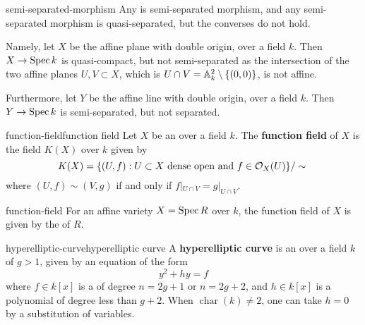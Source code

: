 \begin{example}{semi-separated-morphism}
    Any  is semi-separated morphism, and any semi-separated morphism is quasi-separated, but the converses do not hold.
    
    Namely, let $X$ be the affine plane with double origin, over a field $k$. Then $X \to \Spec k$ is quasi-compact, but not semi-separated as the intersection of the two affine planes $U, V \subset X$, which is $U \cap V = \AA^2_k \setminus \{ (0, 0) \}$, is not affine.
    
    Furthermore, let $Y$ be the affine line with double origin, over a field $k$. Then $Y \to \Spec k$ is semi-separated, but not separated.
\end{example}

\begin{topic}{function-field}{function field}
    Let $X$ be an   over a field $k$. The \textbf{function field} of $X$ is the field $K(X)$ over $k$ given by
    \[ K(X) = \{ (U, f) : U \subset X \textup{ dense open and } f \in \mathcal{O}_X(U) \} / \sim{} \]
    where $(U, f) \sim{} (V, g)$ if and only if $f|_{U \cap V} = g|_{U \cap V}$.
\end{topic}

\begin{example}{function-field}
    For an affine variety $X = \Spec R$ over $k$, the function field of $X$ is given by the  of $R$.
\end{example}

\begin{topic}{hyperelliptic-curve}{hyperelliptic curve}
    A \textbf{hyperelliptic curve} is an  over a field $k$ of  $g > 1$, given by an equation of the form
    \[ y^2 + h y = f \]
    where $f \in k[x]$ is a  of degree $n = 2g + 1$ or $n = 2g + 2$, and $h \in k[x]$ is a polynomial of degree less than $g + 2$. When $\operatorname{char}(k) \ne 2$, one can take $h = 0$ by a substitution of variables.
\end{topic}

